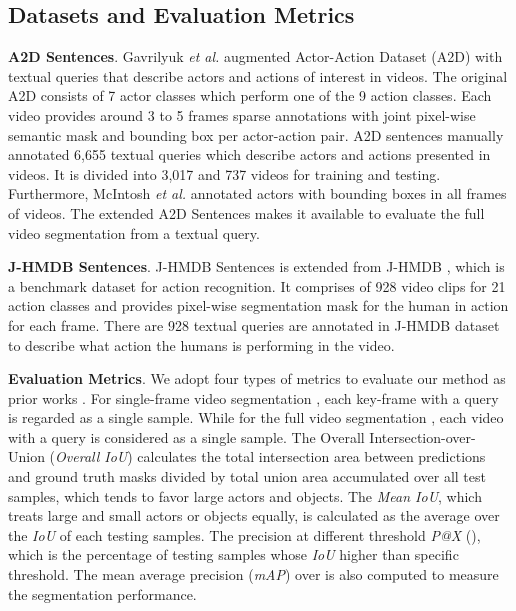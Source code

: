 \documentclass[journal]{IEEEtran}
\begin{document}
\subsection{Datasets and Evaluation Metrics}
\textbf{A2D Sentences}. Gavrilyuk \emph{et al.} \cite{gavrilyuk2018actor} augmented Actor-Action Dataset (A2D) with textual queries that describe actors and actions of interest in videos. The original A2D \cite{xu2015can} consists of 7 actor classes which perform one of the 9 action classes. Each video provides around 3 to 5 frames sparse annotations with joint pixel-wise semantic mask and bounding box per actor-action pair. A2D sentences manually annotated 6,655 textual queries which describe actors and actions presented in videos. It is divided into 3,017 and 737 videos for training and testing. Furthermore, McIntosh \emph{et al.} \cite{mcintosh2018multi} annotated actors with bounding boxes in all frames of videos. The extended A2D Sentences makes it available to evaluate the full video segmentation from a textual query.

\textbf{J-HMDB Sentences}. J-HMDB Sentences is extended from J-HMDB \cite{jhuang2013towards}, which is a benchmark dataset for action recognition. It comprises of 928 video clips for 21 action classes and provides pixel-wise segmentation mask for the human in action for each frame. There are 928 textual queries are annotated in J-HMDB dataset to describe what action the humans is performing in the video.



\textbf{Evaluation Metrics}. We adopt four types of metrics to evaluate our method as prior works \cite{gavrilyuk2018actor,mcintosh2018multi}. For single-frame video segmentation \cite{gavrilyuk2018actor}, each key-frame with a query is regarded as a single sample. While for the full video segmentation \cite{mcintosh2018multi}, each video with a query is considered as a single sample. The Overall Intersection-over-Union (\emph{Overall IoU}) calculates the total intersection area between predictions and ground truth masks divided by total union area accumulated over all test samples, which tends to favor large actors and objects. The \emph{Mean IoU}, which treats large and small actors or objects equally, is calculated as the average over the \emph{IoU} of each testing samples. The precision at different threshold \emph{P@X} (), which is the percentage of testing samples whose \emph{IoU} higher than specific threshold. The mean average precision (\emph{mAP}) over  is also computed to measure the segmentation performance.
\end{document}
